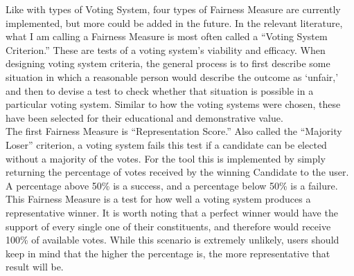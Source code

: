\documentclass[12pt]{article}
\begin{document}
\qquad Like with types of Voting System, four types of Fairness Measure are currently implemented, but more could be added in the future. In the relevant literature, what I am calling a Fairness Measure is most often called a ``Voting System Criterion.'' These are tests of a voting system's viability and efficacy. When designing voting system criteria, the general process is to first describe some situation in which a reasonable person would describe the outcome as `unfair,' and then to devise a test to check whether that situation is possible in a particular voting system. Similar to how the voting systems were chosen, these have been selected for their educational and demonstrative value. \\

\qquad The first Fairness Measure is ``Representation Score.'' Also called the ``Majority Loser'' criterion, a voting system fails this test if a candidate can be elected without a majority of the votes. For the tool this is implemented by simply returning the percentage of votes received by the winning Candidate to the user. A percentage above 50\% is a success, and a percentage below 50\% is a failure. This Fairness Measure is a test for how well a voting system produces a representative winner. It is worth noting that a perfect winner would have the support of every single one of their constituents, and therefore would receive 100\% of available votes. While this scenario is extremely unlikely, users should keep in mind that the higher the percentage is, the more representative that result will be. \\
\end{document}

